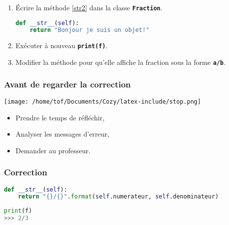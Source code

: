 \documentclass[svgnames,11pt]{beamer}
\begin{document}
\begin{frame}[fragile]
    \frametitle{}

    \begin{activite}
\begin{enumerate}
    \item Écrire la méthode \ref{str2} dans la classe \textbf{\texttt{Fraction}}.
\begin{center}
\begin{lstlisting}[language=Python , basicstyle=\ttfamily\small, xleftmargin=2em, xrightmargin=1em]
def __str__(self):
    return "Bonjour je suis un objet!"
\end{lstlisting}
\label{str2}
\end{center}
\item Exécuter à nouveau \textbf{\texttt{print(f)}}.
\item Modifier la méthode pour qu'elle affiche la fraction sous la forme \textbf{\texttt{a/b}}.
\end{enumerate}
    \end{activite}

\end{frame}
\begin{frame}
    \frametitle{Avant de regarder la correction}
\begin{center}
    \centering
    \texttt{[image: /home/tof/Documents/Cozy/latex-include/stop.png]}
    \end{center}
{\Large
    \begin{itemize}
        \item Prendre le temps de réfléchir,
        \item Analyser les messages d'erreur,
        \item Demander au professeur.
    \end{itemize}
}
\end{frame}
\begin{frame}[fragile]
    \frametitle{Correction}

\begin{center}
\begin{lstlisting}[language=Python , basicstyle=\ttfamily\small, xleftmargin=2em, xrightmargin=1em]
def __str__(self):
    return "{}/{}".format(self.numerateur, self.denominateur)
\end{lstlisting}
\end{center}    
\begin{center}
    \begin{lstlisting}[language=Python , basicstyle=\ttfamily\small, xleftmargin=2em, xrightmargin=1em]
print(f)
>>> 2/3
\end{lstlisting}
    \end{center} 
\end{frame}
\end{document}
